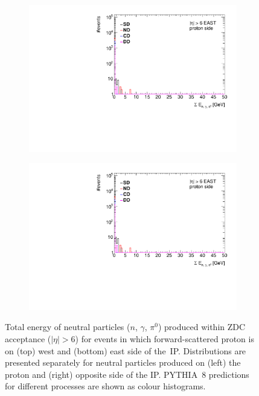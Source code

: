 \begin{figure}[t!]
\begin{subfigure}{.45\textwidth}
	\end{subfigure}
	\begin{subfigure}{.45\textwidth}
		\includegraphics[width=\textwidth, page=3]{chapters/chrgSTAR/img/zdc/out.pdf}
	\end{subfigure}
	\begin{subfigure}{.45\textwidth}
		\includegraphics[width=\textwidth, page=4]{chapters/chrgSTAR/img/zdc/out.pdf}
	\end{subfigure}
		
		
		\caption{Total energy of neutral particles ($n$, $\gamma$, $\pi^{0}$) produced within ZDC acceptance ($|\eta|>6$) for events in which forward-scattered proton is on (top) west and (bottom) east side of the~IP. Distributions are presented separately for neutral particles produced on  (left) the proton and (right) opposite side of the IP. PYTHIA~8 predictions for different processes are shown as colour histograms. }
		\label{fig:zdcSTAR}
\end{figure}